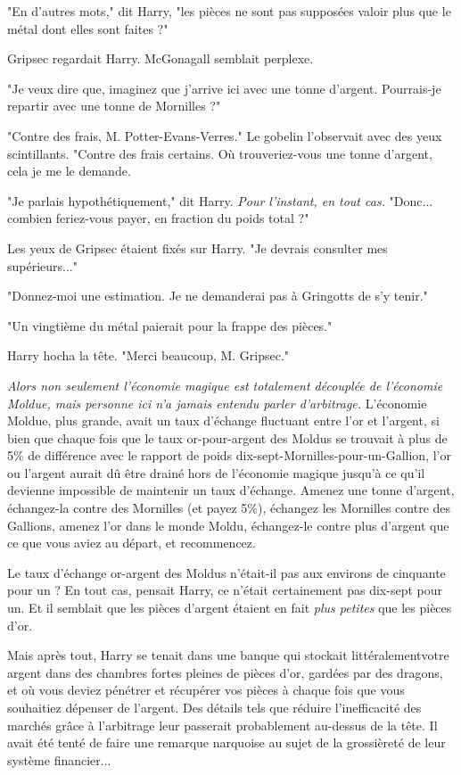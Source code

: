 "En d'autres mots," dit Harry, "les pièces ne sont pas supposées valoir plus que le métal dont elles sont faites ?"

Gripsec regardait Harry. McGonagall semblait perplexe.

"Je veux dire que, imaginez que j'arrive ici avec une tonne d'argent. Pourrais-je repartir avec une tonne de Mornilles ?"

"Contre des frais, M. Potter-Evans-Verres." Le gobelin l'observait avec des yeux scintillants. "Contre des frais certains. Où trouveriez-vous une tonne d'argent, cela je me le demande.

"Je parlais hypothétiquement," dit Harry. \emph{Pour l'instant, en tout cas. } "Donc... combien feriez-vous payer, en fraction du poids total ?"

Les yeux de Gripsec étaient fixés sur Harry. "Je devrais consulter mes supérieurs..."

"Donnez-moi une estimation. Je ne demanderai pas à Gringotts de s'y tenir."

"Un vingtième du métal paierait pour la frappe des pièces."

Harry hocha la tête. "Merci beaucoup, M. Gripsec."

\emph{Alors non seulement l'économie magique est totalement découplée de l'économie Moldue, mais personne ici n'a jamais entendu parler d'arbitrage.}  L'économie Moldue, plus grande, avait un taux d'échange fluctuant entre l'or et l'argent, si bien que chaque fois que le taux or-pour-argent des Moldus se trouvait à plus de 5\% de différence avec le rapport de poids dix-sept-Mornilles-pour-un-Gallion, l'or ou l'argent aurait dû être drainé hors de l'économie magique jusqu'à ce qu'il devienne impossible de maintenir un taux d'échange. Amenez une tonne d'argent, échangez-la contre des Mornilles (et payez 5\%), échangez les Mornilles contre des Gallions, amenez l'or dans le monde Moldu, échangez-le contre plus d'argent que ce que vous aviez au départ, et recommencez.

Le taux d'échange or-argent des Moldus n'était-il pas aux environs de cinquante pour un ? En tout cas, pensait Harry, ce n'était certainement pas dix-sept pour un. Et il semblait que les pièces d'argent étaient en fait \emph{plus petites } que les pièces d'or.

Mais après tout, Harry se tenait dans une banque qui stockait littéralementvotre argent dans des chambres fortes pleines de pièces d'or, gardées par des dragons, et où vous deviez pénétrer et récupérer vos pièces à chaque fois que vous souhaitiez dépenser de l'argent. Des détails tels que réduire l'inefficacité des marchés grâce à l'arbitrage leur passerait probablement au-dessus de la tête. Il avait été tenté de faire une remarque narquoise au sujet de la grossièreté de leur système financier...

